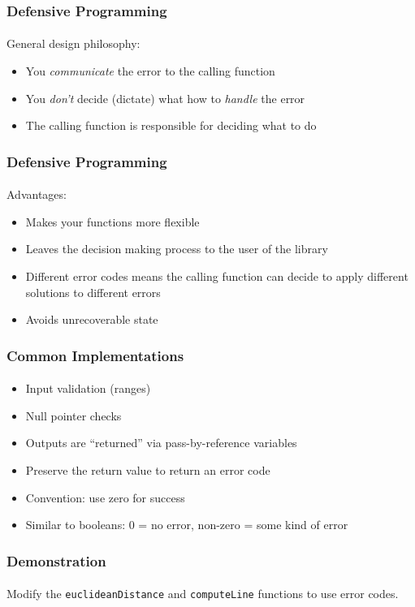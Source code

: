 \documentclass[]{beamer}
\begin{document}
\begin{frame}
    \frametitle{Defensive Programming}
    \framesubtitle{}

General design philosophy: 
\begin{itemize}[<+->]
  \item You \emph{communicate} the error to the calling function
  \item You \emph{don't} decide (dictate) what how to \emph{handle} the error
  \item The calling function is responsible for deciding what to do
\end{itemize}

\end{frame}

\begin{frame}
    \frametitle{Defensive Programming}
    \framesubtitle{}

Advantages:
\begin{itemize}[<+->]
  \item Makes your functions more flexible
  \item Leaves the decision making process to the user of the library
  \item Different error codes means the calling function can decide to apply different solutions to different errors
  \item Avoids unrecoverable state
\end{itemize}

\end{frame}

\begin{frame}
    \frametitle{Common Implementations}
    \framesubtitle{}

\begin{itemize}[<+->]
  \item Input validation (ranges)
  \item Null pointer checks
  \item Outputs are ``returned'' via pass-by-reference variables
  \item Preserve the return value to return an error code
  \item Convention: use zero for success
  \item Similar to booleans: 0 = no error, non-zero = some kind of error
\end{itemize}

\end{frame}

\begin{frame}
    \frametitle{Demonstration}
    \framesubtitle{}

Modify the \texttt{euclideanDistance} and \texttt{computeLine}
functions to use error codes.

\end{frame}
\end{document}
